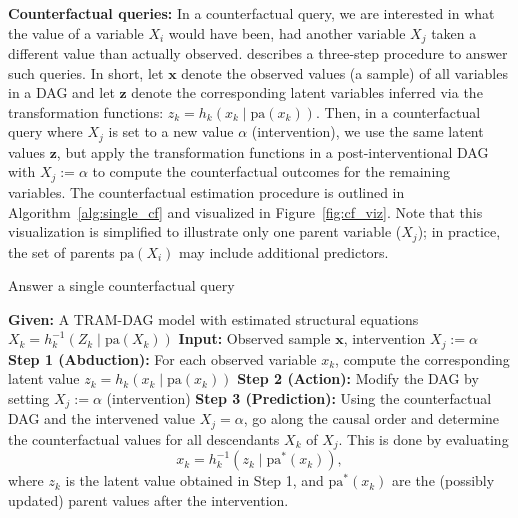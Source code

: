\medskip

\textbf{Counterfactual queries:} In a counterfactual query, we are interested in what the value of a variable $X_i$ would have been, had another variable $X_j$ taken a different value than actually observed. \citet{pearl_book2009} describes a three-step procedure to answer such queries. In short, let $\mathbf{x}$ denote the observed values (a sample) of all variables in a DAG and let $\mathbf{z}$ denote the corresponding latent variables inferred via the transformation functions: $z_k = h_k(x_k \mid \text{pa}(x_k))$. Then, in a counterfactual query where $X_j$ is set to a new value $\alpha$ (intervention), we use the same latent values $\mathbf{z}$, but apply the transformation functions in a post-interventional DAG with $X_j := \alpha$ to compute the counterfactual outcomes for the remaining variables.
The counterfactual estimation procedure is outlined in Algorithm~\ref{alg:single_cf} and visualized in Figure~\ref{fig:cf_viz}. Note that this visualization is simplified to illustrate only one parent variable ($X_j$); in practice, the set of parents $\text{pa}(X_i)$ may include additional predictors.

\begin{algorithm}[!ht]
\caption{Answer a single counterfactual query}
\label{alg:single_cf}
\begin{algorithmic}
\State \textbf{Given:} A TRAM-DAG model with estimated structural equations $X_k = h_k^{-1}(Z_k \mid \text{pa}(X_k))$
\State \textbf{Input:} Observed sample $\mathbf{x}$, intervention $X_j := \alpha$
\vspace{0.3em}
\State \textbf{Step 1 (Abduction):} For each observed variable $x_k$, compute the corresponding latent value $z_k = h_k(x_k \mid \text{pa}(x_k))$
\vspace{0.3em}
\State \textbf{Step 2 (Action):} Modify the DAG by setting $X_j := \alpha$ (intervention)
\vspace{0.3em}
\State \textbf{Step 3 (Prediction):} Using the counterfactual DAG and the intervened value $X_j = \alpha$, go along the causal order and determine the counterfactual values for all descendants $X_k$ of $X_j$. This is done by evaluating
\[
x_k = h_k^{-1}(z_k \mid \text{pa}^*(x_k)),
\]
where $z_k$ is the latent value obtained in Step 1, and $\text{pa}^*(x_k)$ are the (possibly updated) parent values after the intervention.
\end{algorithmic}
\end{algorithm}

